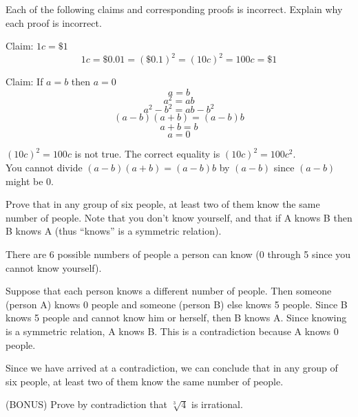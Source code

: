 \documentclass[solution, letterpaper]{cs20inclass}
\begin{document}
\problem

Each of the following claims and corresponding proofs is incorrect. Explain why each proof is incorrect.

\subproblem Claim: $1c = \$1$   \[ 1c = \$0.01= (\$ 0.1)^2 = (10c)^2 = 100c =\$1 \]

\subproblem Claim: If $a=b$ then $a=0$\\ \[a=b\]\[a^2=ab\]\[a^2-b^2=ab-b^2\]\[(a-b)(a+b)=(a-b)b\]\[a+b=b\]\[a=0\]

\begin{solution}
  \subsolution $(10c)^2 = 100c$ is not true. The correct equality is $(10c)^2 = 100c^2$.
  \\
  \subsolution You cannot divide $(a-b)(a+b) = (a-b)b$ by $(a-b)$ since $(a-b)$ might be 0.
\end{solution}

\problem

Prove that in any group of six people, at least two of them know the same number of people. Note that you don't know yourself, and that if A knows B then B knows A (thus ``knows'' is a symmetric relation). 

\begin{solution}

There are 6 possible numbers of people a person can know (0 through 5 since you cannot know yourself).

Suppose that each person knows a different number of people. Then someone (person A) knows 0 people and someone (person B) else knows 5 people. Since B knows 5 people and cannot know him or herself, then B knows A. Since knowing is a symmetric relation, A knows B. This is a contradiction because A knows 0 people.

Since we have arrived at a contradiction, we can conclude that in any group of six people, at least two of them know the same number of people.

\end{solution}

\problem

(BONUS) Prove by contradiction that $\sqrt[3]{4}$ is irrational.
\end{document}
